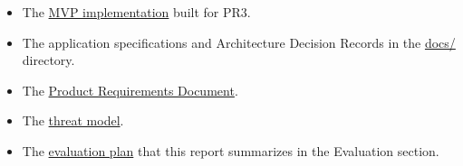 \documentclass[12pt]{article}
\newcommand{\PRNumber}{3}
\newcommand{\RepoURL}{https://github.com/Ian-Costa18/Cybersecurity-Practicum/blob/progress-report-\PRNumber}
\begin{document}
\begin{itemize}[leftmargin=1.5em, itemsep=2pt]
  \item The \href{\RepoURL/src}{MVP implementation} built for PR3.
  \item The application specifications and Architecture Decision Records in the \href{\RepoURL/docs}{docs/} directory.
  \item The \href{\RepoURL/docs/mvp-prd.md}{Product Requirements Document}.
  \item The \href{\RepoURL/docs/threat-model.md}{threat model}.
  \item The \href{\RepoURL/docs/evaluation-plan.md}{evaluation plan} that this report summarizes in the Evaluation section.
\end{itemize}
\end{document}

